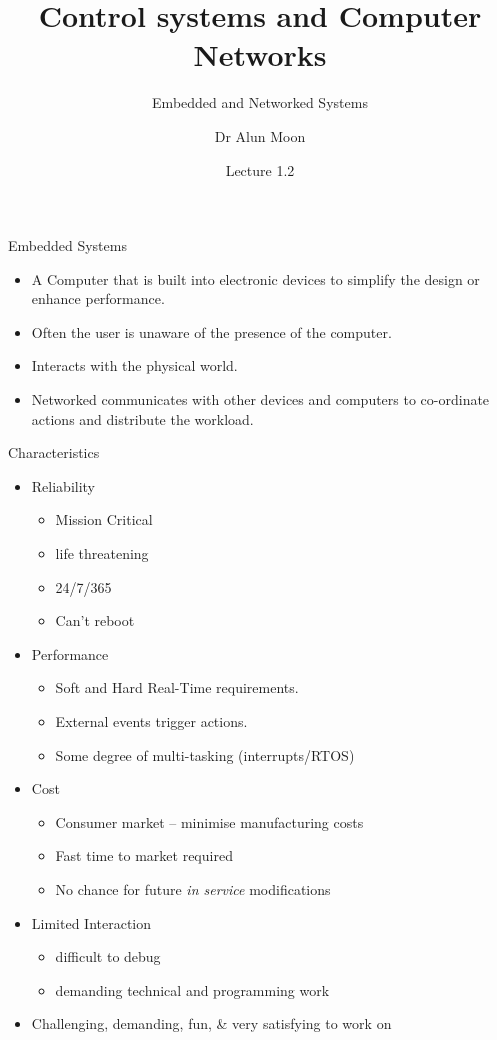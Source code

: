\documentclass[xcolor=svgnames]{beamer}
\title{Control systems and Computer Networks}
\subtitle{Embedded and Networked Systems}
\author{Dr Alun Moon}
\date{Lecture 1.2}
\begin{document}
\frame{\maketitle}

\begin{frame}{Embedded Systems}
  \begin{itemize}[<+->]
  \item A \alert{Computer} that is built into \alert{electronic devices} to
        simplify the design or enhance performance.
  \item Often the user is unaware of the presence of the computer.
  \item Interacts with  the physical world.
  \item \alert{Networked} communicates with other devices and computers to
        co-ordinate actions and distribute the workload.
\end{itemize}
\end{frame}

\begin{frame}{Characteristics}
\begin{itemize}[<+->]
  \item Reliability
  \begin{itemize}
    \item Mission Critical
    \item life threatening
    \item 24/7/365
    \item Can't reboot
  \end{itemize}
    \item Performance
    \begin{itemize}
      \item \alert{Soft} and \alert{Hard} Real-Time requirements.
      \item External events trigger actions.
      \item Some degree of multi-tasking (interrupts/RTOS)
      \end{itemize}
    \item Cost
    \begin{itemize}
      \item Consumer market -- minimise manufacturing costs
      \item Fast time to market required
      \item No chance for future \emph{in service} modifications
    \end{itemize}
    \item Limited Interaction
    \begin{itemize}
      \item difficult to debug
      \item demanding technical and programming work
    \end{itemize}
    \item \colorbox{NUblue!40}{Challenging, demanding, fun, \& very satisfying to work on}
\end{itemize}
\end{frame}
\end{document}
